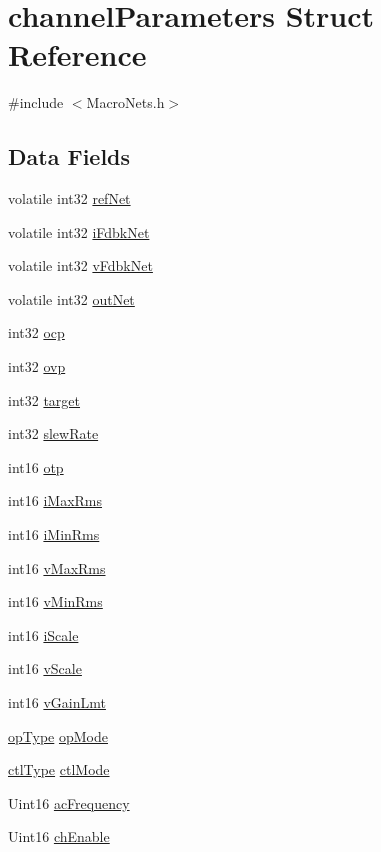 \hypertarget{a00003}{\section{channel\-Parameters Struct Reference}
\label{a00003}
}


{\ttfamily \#include $<$Macro\-Nets.\-h$>$}

\subsection*{Data Fields}
\begin{DoxyCompactItemize}
\item 
volatile int32 \hyperlink{a00003_a8e3dbb10da7b72b7b4fe6c200fbb495c}{ref\-Net}
\item 
volatile int32 \hyperlink{a00003_ad4f53b220d97af172b01f1a6d57a9635}{i\-Fdbk\-Net}
\item 
volatile int32 \hyperlink{a00003_a5b3f0afc0e3ef0bc0726ee695570e787}{v\-Fdbk\-Net}
\item 
volatile int32 \hyperlink{a00003_ae9a6e93b8f7d8554dd06269339167215}{out\-Net}
\item 
int32 \hyperlink{a00003_a95bd86963045f10f75c656956a09858c}{ocp}
\item 
int32 \hyperlink{a00003_aefb9a7e765e361d08e0ae0bbc352e244}{ovp}
\item 
int32 \hyperlink{a00003_a2d9b0f07810affea40c8502613b8984e}{target}
\item 
int32 \hyperlink{a00003_a09eb121ecb75a652f7689869d1685a30}{slew\-Rate}
\item 
int16 \hyperlink{a00003_a9df39dee6c165c882bb04e26b17e3e25}{otp}
\item 
int16 \hyperlink{a00003_ab4b8dda9d3ab4395a3fde8bc0e403212}{i\-Max\-Rms}
\item 
int16 \hyperlink{a00003_a12f6946f5b0ee1235d7edcb6a22a4518}{i\-Min\-Rms}
\item 
int16 \hyperlink{a00003_a21e56dc9f903bbea9c980648a8ffc097}{v\-Max\-Rms}
\item 
int16 \hyperlink{a00003_af6a4d30899a436a77b24b99baa2852f6}{v\-Min\-Rms}
\item 
int16 \hyperlink{a00003_a022031c9e8a34b37c6cd05d8d7934a13}{i\-Scale}
\item 
int16 \hyperlink{a00003_a7bdcae99eedfaaa8bfda6088cec1c08d}{v\-Scale}
\item 
int16 \hyperlink{a00003_a7dd5ddd959b3f3344721e729e51f0db5}{v\-Gain\-Lmt}
\item 
\hyperlink{a00021_acd90d47e6937efc4183ab0d18f787575}{op\-Type} \hyperlink{a00003_a25d490fa4d7487c8e2e21c1400a6b99b}{op\-Mode}
\item 
\hyperlink{a00021_a5cd368998e9721e657fd7bc6d413807a}{ctl\-Type} \hyperlink{a00003_ab31dab8e873272dd15641943b20e56a5}{ctl\-Mode}
\item 
Uint16 \hyperlink{a00003_a817bac18060f842dca3867eeb7e2d06c}{ac\-Frequency}
\item 
Uint16 \hyperlink{a00003_af99576e00746544eab1d4e88d12f39b4}{ch\-Enable}
\end{DoxyCompactItemize}


